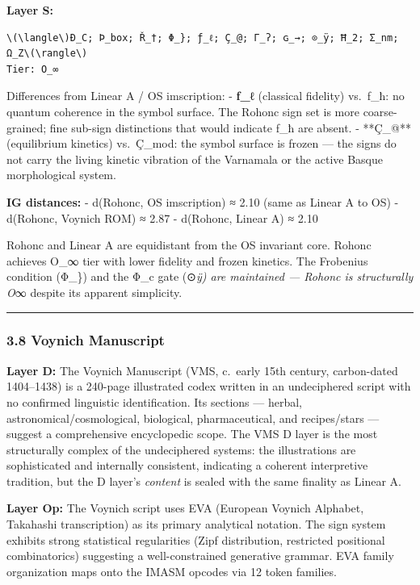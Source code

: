 \textbf{Layer S:}

\begin{verbatim}
\(\langle\)Ð_C; Þ_box; Ř_†; Φ_}; ƒ_ℓ; Ç_@; Γ_ʔ; ɢ_→; ⊙_ÿ; Ħ_2; Σ_nm; Ω_Z\(\rangle\)
Tier: O_∞
\end{verbatim}

Differences from Linear A / OS imscription: - \textbf{ƒ\_ℓ} (classical
fidelity) vs.~ƒ\_ħ: no quantum coherence in the symbol surface. The
Rohonc sign set is more coarse-grained; fine sub-sign distinctions that
would indicate ƒ\_ħ are absent. - **Ç\_@** (equilibrium kinetics)
vs.~Ç\_mod: the symbol surface is frozen --- the signs do not carry the
living kinetic vibration of the Varnamala or the active Basque
morphological system.

\textbf{IG distances:} - d(Rohonc, OS imscription) ≈ 2.10 (same as
Linear A to OS) - d(Rohonc, Voynich ROM) ≈ 2.87 - d(Rohonc, Linear A) ≈
2.10

Rohonc and Linear A are equidistant from the OS invariant core. Rohonc
achieves O\_∞ tier with lower fidelity and frozen kinetics. The
Frobenius condition (Φ\_\}) and the Φ\_c gate (⊙\emph{ÿ) are maintained
--- Rohonc is structurally O}∞ despite its apparent simplicity.

\begin{center}\rule{0.5\linewidth}{0.5pt}\end{center}

\subsubsection{3.8 Voynich Manuscript}\label{voynich-manuscript}

\textbf{Layer D:} The Voynich Manuscript (VMS, c.~early 15th century,
carbon-dated 1404--1438) is a 240-page illustrated codex written in an
undeciphered script with no confirmed linguistic identification. Its
sections --- herbal, astronomical/cosmological, biological,
pharmaceutical, and recipes/stars --- suggest a comprehensive
encyclopedic scope. The VMS D layer is the most structurally complex of
the undeciphered systems: the illustrations are sophisticated and
internally consistent, indicating a coherent interpretive tradition, but
the D layer's \emph{content} is sealed with the same finality as Linear
A.

\textbf{Layer Op:} The Voynich script uses EVA (European Voynich
Alphabet, Takahashi transcription) as its primary analytical notation.
The sign system exhibits strong statistical regularities (Zipf
distribution, restricted positional combinatorics) suggesting a
well-constrained generative grammar. EVA family organization maps onto
the IMASM opcodes via 12 token families.

